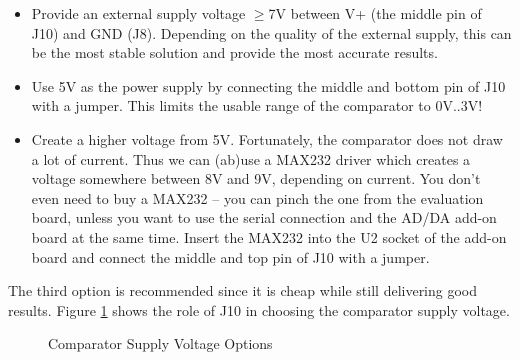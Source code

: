 \documentclass{article}
\begin{document}
\begin{itemize}
\item Provide an external supply voltage $\ge$7V between V+ (the middle pin of J10) and GND (J8). Depending on the quality of the external supply, this can be the most stable solution and provide the most accurate results. 
\item Use 5V as the power supply by connecting the middle and bottom pin of J10 with a jumper. This limits the usable range of the comparator to 0V..3V!
\item Create a higher voltage from 5V. Fortunately, the comparator does not draw a lot of current. Thus we can (ab)use a MAX232 driver which creates a voltage somewhere between 8V and 9V, depending on current. You don't even need to buy a MAX232 -- you can pinch the one from the evaluation board, unless you want to use the serial connection and the AD/DA add-on board at the same time. Insert the MAX232 into the U2 socket of the add-on board and connect the middle and top pin of J10 with a jumper. 
\end{itemize}

The third option is recommended since it is cheap while still delivering good results. Figure \ref{fig:cmpSupplyOptions} shows the role of J10 in choosing the comparator supply voltage. 
\begin{figure}[htb]
\centering
{}
\caption{Comparator Supply Voltage Options}
\label{fig:cmpSupplyOptions}
\end{figure}
\end{document}
